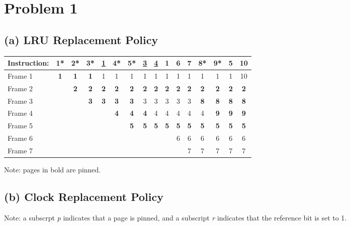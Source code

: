 \documentclass[a4paper, 12pt]{article}
\begin{document}
\section*{Problem 1}

\subsection*{(a) LRU Replacement Policy}

\begin{table}[h]
	\centering
	\begin{tabular}{l c c c c c c c c c c c c c c c}
		Instruction: & 1* & 2* & 3* & \underline{1} & 4* & 5* & \underline{3} &
		\underline{4} & 1 & 6 & 7 & 8* & 9* & 5 & 10 \\
		\hline
		Frame 1 & \textbf{1} & \textbf{1} & \textbf{1} & 1 & 1 & 1 & 1 & 1 & 1 &
		1 & 1 & 1 & 1 & 1 & 10 \\
		Frame 2 & & \textbf{2} & \textbf{2} & \textbf{2} & \textbf{2} &
		\textbf{2} & \textbf{2} & \textbf{2} & \textbf{2} & \textbf{2} &
		\textbf{2} & \textbf{2} & \textbf{2} & \textbf{2} & \textbf{2} \\
		Frame 3 & & & \textbf{3} & \textbf{3} & \textbf{3} & \textbf{3} & 3 & 3
		& 3 & 3 & 3 & \textbf{8} & \textbf{8} & \textbf{8} & \textbf{8} \\
		Frame 4 & & & & & \textbf{4} & \textbf{4} & \textbf{4} & 4 & 4 & 4 & 4 &
		4 & \textbf{9} & \textbf{9} & \textbf{9} \\
		Frame 5 & & & & & & \textbf{5} & \textbf{5} & \textbf{5} & \textbf{5} &
		\textbf{5} & \textbf{5} & \textbf{5} & \textbf{5} & \textbf{5} &
		\textbf{5} \\
		Frame 6 & & & & & & & & & & 6 & 6 & 6 & 6 & 6 & 6 \\
		Frame 7 & & & & & & & & & & & 7 & 7 & 7 & 7 & 7 \\
	\end{tabular}
\end{table}

Note: pages in bold are pinned.

\subsection*{(b) Clock Replacement Policy}

Note: a subscrpt \textit{p} indicates that a page is pinned, and a subscript
\textit{r} indicates that the reference bit is set to 1.
\end{document}
